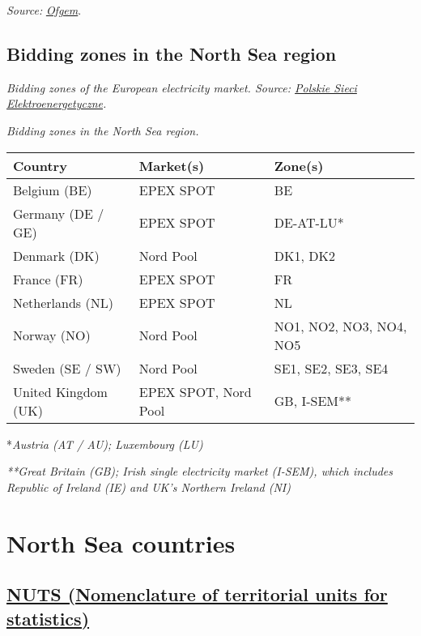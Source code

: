 \emph{Source:}
\href{https://www.ofgem.gov.uk/sites/default/files/docs/2014/10/fta_bidding_zone_configuration_literature_review_1.pdf}{\emph{Ofgem}}.

\hypertarget{bidding-zones-in-the-north-sea-region}{%
\subsection{Bidding zones in the North Sea
region}\label{bidding-zones-in-the-north-sea-region}}


\emph{Bidding zones of the European electricity market. Source:
\href{http://raport.pse.pl/en/trends-and-market-context}{Polskie Sieci
Elektroenergetyczne}.}

\emph{Bidding zones in the North Sea region.}

\begin{longtable}[]{@{}lll@{}}
\toprule
\textbf{Country} & \textbf{Market(s)} & \textbf{Zone(s)}\tabularnewline
\midrule
\endhead
Belgium (BE) & EPEX SPOT & BE\tabularnewline
Germany (DE / GE) & EPEX SPOT & DE-AT-LU*\tabularnewline
Denmark (DK) & Nord Pool & DK1, DK2\tabularnewline
France (FR) & EPEX SPOT & FR\tabularnewline
Netherlands (NL) & EPEX SPOT & NL\tabularnewline
Norway (NO) & Nord Pool & NO1, NO2, NO3, NO4, NO5\tabularnewline
Sweden (SE / SW) & Nord Pool & SE1, SE2, SE3, SE4\tabularnewline
United Kingdom (UK) & EPEX SPOT, Nord Pool & GB, I-SEM**\tabularnewline
\bottomrule
\end{longtable}

*\emph{Austria (AT / AU); Luxembourg (LU)}

\emph{**Great Britain (GB); Irish single electricity market (I-SEM),
which includes Republic of Ireland (IE) and UK's Northern Ireland (NI)}

\hypertarget{north-sea-countries}{%
\section{North Sea countries}\label{north-sea-countries}}

\hypertarget{nuts-nomenclature-of-territorial-units-for-statistics-}{%
\subsection{\texorpdfstring{\href{https://ec.europa.eu/eurostat/web/nuts/background}{NUTS
(Nomenclature of territorial units for
statistics)}}{NUTS (Nomenclature of territorial units for statistics)}}\label{nuts-nomenclature-of-territorial-units-for-statistics-}}

